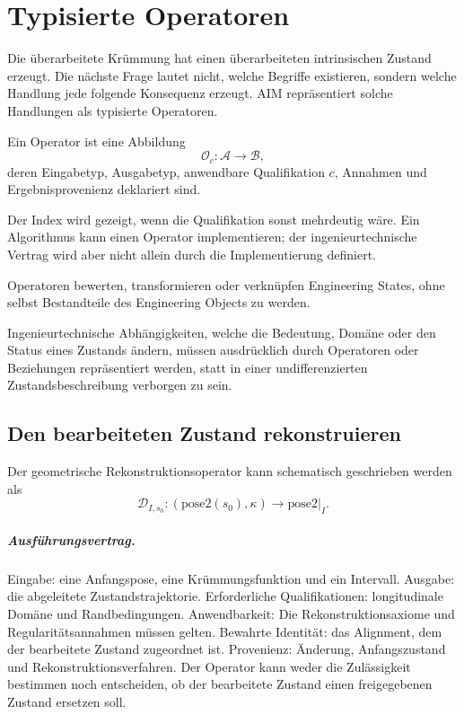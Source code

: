 
\chapter{Typisierte Operatoren}
\label{chap:operators}

Die überarbeitete Krümmung hat einen überarbeiteten intrinsischen Zustand
erzeugt. Die nächste Frage lautet nicht, welche Begriffe existieren, sondern
welche Handlung jede folgende Konsequenz erzeugt. AIM repräsentiert solche
Handlungen als typisierte Operatoren.

\begin{definition}[Operator]
\label{def:operator}
Ein Operator ist eine Abbildung
\[
\mathcal O_c:\mathcal A\rightarrow\mathcal B,
\]
deren Eingabetyp, Ausgabetyp, anwendbare Qualifikation \(c\), Annahmen und
Ergebnisprovenienz deklariert sind.
\end{definition}

Der Index wird gezeigt, wenn die Qualifikation sonst mehrdeutig wäre. Ein
Algorithmus kann einen Operator implementieren; der ingenieurtechnische
Vertrag wird aber nicht allein durch die Implementierung definiert.

\begin{principle}
\label{princ:state-operator-relation}
Operatoren bewerten, transformieren oder verknüpfen Engineering States, ohne
selbst Bestandteile des Engineering Objects zu werden.
\end{principle}

\begin{proposition}
\label{prop:operator-explicit-dependencies}
Ingenieurtechnische Abhängigkeiten, welche die Bedeutung, Domäne oder den
Status eines Zustands ändern, müssen ausdrücklich durch Operatoren oder
Beziehungen repräsentiert werden, statt in einer undifferenzierten
Zustandsbeschreibung verborgen zu sein.
\end{proposition}

\section{Den bearbeiteten Zustand rekonstruieren}

Der geometrische Rekonstruktionsoperator kann schematisch geschrieben werden
als
\[
\mathcal D_{I,s_0}:
(\mathrm{pose2}(s_0),\kappa)
\longrightarrow \mathrm{pose2}|_I.
\]

\paragraph{Ausführungsvertrag.}
Eingabe: eine Anfangspose, eine Krümmungsfunktion und ein Intervall. Ausgabe:
die abgeleitete Zustandstrajektorie. Erforderliche Qualifikationen:
longitudinale Domäne und Randbedingungen. Anwendbarkeit: Die
Rekonstruktionsaxiome und Regularitätsannahmen müssen gelten. Bewahrte
Identität: das Alignment, dem der bearbeitete Zustand zugeordnet ist.
Provenienz: Änderung, Anfangszustand und Rekonstruktionsverfahren. Der
Operator kann weder die Zulässigkeit bestimmen noch entscheiden, ob der
bearbeitete Zustand einen freigegebenen Zustand ersetzen soll.

